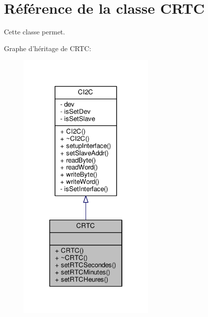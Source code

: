 \hypertarget{classCRTC}{\section{Référence de la classe C\+R\+T\+C}
\label{classCRTC}
}


Cette classe permet.  




Graphe d'héritage de C\+R\+T\+C\+:
\nopagebreak
\begin{figure}[H]
\begin{center}
\leavevmode
\includegraphics[width=190pt]{classCRTC__inherit__graph}
\end{center}
\end{figure}


